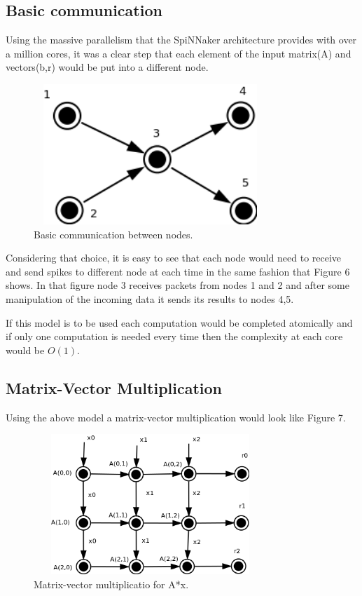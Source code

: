 \documentclass[12pt,a4paper]{article}
\begin{document}
\subsection{Basic communication}
Using the massive parallelism that the SpiNNaker architecture provides with over a million cores, it was a clear step that each element of the input matrix(A) and vectors(b,r) would be put into a different node. 
\begin{figure}[h!]
\includegraphics[width=250pt,height=150pt,scale=2]{Pics/basic.png}
\centering
\caption{Basic communication between nodes.}
\end{figure}
Considering that choice, it is easy to see that each node would need to receive and send spikes to different node at each time in the same fashion that Figure 6 shows. In that figure node 3 receives packets from nodes 1 and 2 and after some manipulation of the incoming data it sends its results to nodes 4,5. 

If this model is to be used each computation would be completed atomically and if only one computation is needed every time then the complexity at each core would be $O(1)$.
\subsection{Matrix-Vector Multiplication}
Using the above model a matrix-vector multiplication would look like Figure 7. 
\begin{figure}[h!]
\includegraphics[width=250pt,height=150pt,scale=2]{Pics/mat0mult.png}
\centering
\caption{Matrix-vector multiplicatio for A*x.}
\end{figure}
\end{document}
